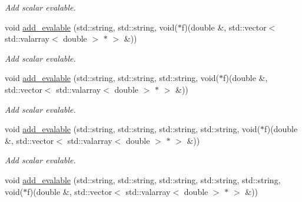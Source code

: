 \begin{CompactItemize}
\begin{CompactList}\small\item\em Add scalar evalable. \item\end{CompactList}\item 
\hypertarget{classmeasurements_c581fa935ff298814477770f0644b21c}{
void \hyperlink{classmeasurements_c581fa935ff298814477770f0644b21c}{add\_\-evalable} (std::string, std::string, void($\ast$f)(double \&, std::vector$<$ std::valarray$<$ double $>$ $\ast$ $>$ \&))}
\label{classmeasurements_c581fa935ff298814477770f0644b21c}

\begin{CompactList}\small\item\em Add scalar evalable. \item\end{CompactList}\item 
\hypertarget{classmeasurements_bd5602f6b1f2e9d5c85d419d4bb25f97}{
void \hyperlink{classmeasurements_bd5602f6b1f2e9d5c85d419d4bb25f97}{add\_\-evalable} (std::string, std::string, std::string, void($\ast$f)(double \&, std::vector$<$ std::valarray$<$ double $>$ $\ast$ $>$ \&))}
\label{classmeasurements_bd5602f6b1f2e9d5c85d419d4bb25f97}

\begin{CompactList}\small\item\em Add scalar evalable. \item\end{CompactList}\item 
\hypertarget{classmeasurements_374fccf7c1338d870745242b59268d2b}{
void \hyperlink{classmeasurements_374fccf7c1338d870745242b59268d2b}{add\_\-evalable} (std::string, std::string, std::string, std::string, void($\ast$f)(double \&, std::vector$<$ std::valarray$<$ double $>$ $\ast$ $>$ \&))}
\label{classmeasurements_374fccf7c1338d870745242b59268d2b}

\begin{CompactList}\small\item\em Add scalar evalable. \item\end{CompactList}\item 
\hypertarget{classmeasurements_7ee56daa510eb09756dafde2eb853da3}{
void \hyperlink{classmeasurements_7ee56daa510eb09756dafde2eb853da3}{add\_\-evalable} (std::string, std::string, std::string, std::string, std::string, void($\ast$f)(double \&, std::vector$<$ std::valarray$<$ double $>$ $\ast$ $>$ \&))}
\label{classmeasurements_7ee56daa510eb09756dafde2eb853da3}


\end{CompactItemize}
